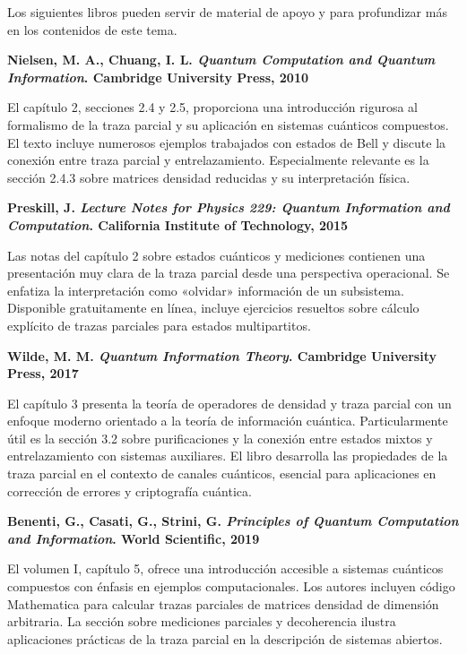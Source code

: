 
Los siguientes libros pueden servir de material de apoyo y para profundizar más en los contenidos de este tema.

\textbf{Nielsen, M. A., Chuang, I. L. \textit{Quantum Computation and Quantum Information}. Cambridge University Press, 2010}

El capítulo 2, secciones 2.4 y 2.5, proporciona una introducción rigurosa al formalismo de la traza parcial y su aplicación en sistemas cuánticos compuestos. El texto incluye numerosos ejemplos trabajados con estados de Bell y discute la conexión entre traza parcial y entrelazamiento. Especialmente relevante es la sección 2.4.3 sobre matrices densidad reducidas y su interpretación física.


\textbf{Preskill, J. \textit{Lecture Notes for Physics 229: Quantum Information and Computation}. California Institute of Technology, 2015}

Las notas del capítulo 2 sobre estados cuánticos y mediciones contienen una presentación muy clara de la traza parcial desde una perspectiva operacional. Se enfatiza la interpretación como «olvidar» información de un subsistema. Disponible gratuitamente en línea, incluye ejercicios resueltos sobre cálculo explícito de trazas parciales para estados multipartitos.


\textbf{Wilde, M. M. \textit{Quantum Information Theory}. Cambridge University Press, 2017}

El capítulo 3 presenta la teoría de operadores de densidad y traza parcial con un enfoque moderno orientado a la teoría de información cuántica. Particularmente útil es la sección 3.2 sobre purificaciones y la conexión entre estados mixtos y entrelazamiento con sistemas auxiliares. El libro desarrolla las propiedades de la traza parcial en el contexto de canales cuánticos, esencial para aplicaciones en corrección de errores y criptografía cuántica.


\textbf{Benenti, G., Casati, G., Strini, G. \textit{Principles of Quantum Computation and Information}. World Scientific, 2019}

El volumen I, capítulo 5, ofrece una introducción accesible a sistemas cuánticos compuestos con énfasis en ejemplos computacionales. Los autores incluyen código Mathematica para calcular trazas parciales de matrices densidad de dimensión arbitraria. La sección sobre mediciones parciales y decoherencia ilustra aplicaciones prácticas de la traza parcial en la descripción de sistemas abiertos.